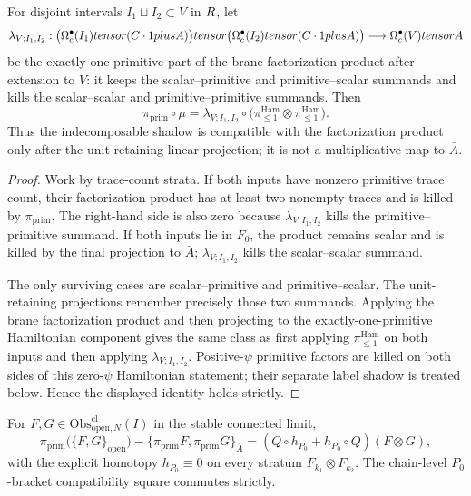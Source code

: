 \begin{thm}\label{thm:chain-level-primitive-projection-factorization}
  For disjoint intervals \(I_1\sqcup I_2\subset V\) in \(R\), let
  \[
    \lambda_{V;I_1,I_2}:
    \bigl(\Omega^\bullet_c(I_1)tensor(C\cdot1plusA)\bigr)
    tensor
    \bigl(\Omega^\bullet_c(I_2)tensor(C\cdot1plusA)\bigr)
    \longrightarrow
    \Omega^\bullet_c(V)tensorA
  \]
  be the exactly-one-primitive part of the brane factorization product
  after extension to \(V\): it keeps the scalar--primitive and
  primitive--scalar summands and kills the scalar--scalar and
  primitive--primitive summands.  Then
  \[
    \pi_{\mathrm{prim}}\circ\mu
      =
    \lambda_{V;I_1,I_2}\circ
      \bigl(\pi_{\leq1}^{\mathrm{Ham}}\otimes
            \pi_{\leq1}^{\mathrm{Ham}}\bigr).
  \]
  Thus the indecomposable shadow is compatible with the factorization
  product only after the unit-retaining linear projection; it is not a
  multiplicative map to \(\bar A\).
\end{thm}

\begin{proof}
  Work by trace-count strata.  If both inputs have nonzero primitive
  trace count, their factorization product has at least two nonempty
  traces and is killed by \(\pi_{\mathrm{prim}}\).  The right-hand side is
  also zero because \(\lambda_{V;I_1,I_2}\) kills the
  primitive--primitive summand.  If both inputs lie in \(F_0\), the
  product remains scalar and is killed by the final projection to
  \(\bar A\); \(\lambda_{V;I_1,I_2}\) kills the scalar--scalar summand.

  The only surviving cases are scalar--primitive and primitive--scalar.
  The unit-retaining projections remember precisely those two summands.
  Applying the brane factorization product and then projecting to the
  exactly-one-primitive Hamiltonian component gives the same class as
  first applying \(\pi_{\leq1}^{\mathrm{Ham}}\) on both inputs and then
  applying \(\lambda_{V;I_1,I_2}\).  Positive-\(\psi\) primitive factors
  are killed on both sides of this zero-\(\psi\) Hamiltonian statement;
  their separate label shadow is treated below.  Hence the displayed
  identity holds strictly.
\end{proof}

\begin{thm}\label{thm:chain-level-primitive-projection-P0}
  For $F,G\in\mathrm{Obs}^{\mathrm{cl}}_{\mathrm{open},N}(I)$ in the
  stable connected limit,
  $$\pi_{\mathrm{prim}}\bigl(\{F,G\}_{\mathrm{open}}\bigr)
    -\bigl\{\pi_{\mathrm{prim}}F,\pi_{\mathrm{prim}}G\bigr\}_{\bar A}
    =(Q\circ h_{P_0}+h_{P_0}\circ Q)(F\otimes G),$$
  with the explicit homotopy $h_{P_0}\equiv 0$ on every stratum
  $F_{k_1}\otimes F_{k_2}$. The chain-level $P_0$-bracket compatibility
  square commutes strictly.
\end{thm}


